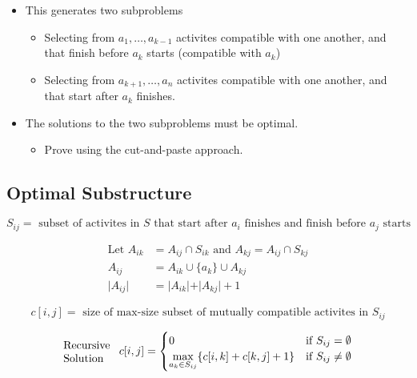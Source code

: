 \documentclass{article}
\begin{document}
\begin{itemize}
    \item This generates two subproblems
          \begin{itemize}
              \item Selecting from \(a_1, \ldots, a_{k-1}\) activites compatible
                    with one another, and that finish before \(a_k\) starts
                    (compatible with \(a_k\))
              \item Selecting from \(a_{k+1}, \ldots, a_n\) activites compatible
                    with one another, and that start after \(a_k\) finishes.
          \end{itemize}
    \item The solutions to the two subproblems must be optimal.
          \begin{itemize}
              \item Prove using the cut-and-paste approach.
          \end{itemize}
\end{itemize}

\subsection*{Optimal Substructure}
\begin{equation*}
    S_{ij} = \text{ subset of activites in } S \text{ that start after } a_i \text{ finishes and finish before } a_j \text{ starts}
\end{equation*}

\begin{align*}
    \text{Let } A_{ik} & = A_{ij} \cap S_{ik} \text{ and } A_{kj} = A_{ij} \cap S_{kj} \\
    A_{ij}             & = A_{ik} \cup \{a_k\} \cup A_{kj}                             \\
    \vert A_{ij} \vert & = \vert A_{ik} \vert + \vert A_{kj} \vert + 1
\end{align*}

\begin{equation*}
    c[i, j] = \text{ size of max-size subset of mutually compatible activites in } S_{ij}
\end{equation*}

\begin{equation*}
    \parbox{5em}{Recursive\\Solution} c[i, j] = \begin{cases}
        0                                                        & \text{if } S_{ij} = \emptyset    \\
        \underset{a_k \in S_{ij}}{\max}\{c[i, k] + c[k, j] + 1\} & \text{if } S_{ij} \neq \emptyset
    \end{cases}
\end{equation*}
\end{document}
